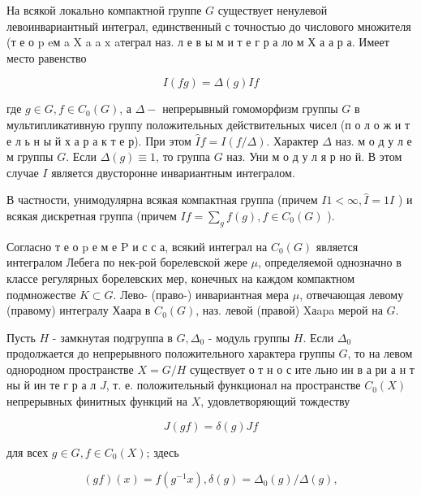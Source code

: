 \documentclass[10pt]{article}
\begin{document}
На всякой локально компактной группе $G$ существует ненулевой левоинвариантный интеграл, единственный с точностью до числового множителя (т е о p eм a X a a $\mathrm{x}$ aтеграл наз. л е в ы м и т е г р а ло м Х а а р а. Имеет место равенство



\[

I(f g)=\Delta(g) I f

\]



где $g \in G, f \in C_{0}(G)$, а $\Delta-$ непрерывный гомоморфизм группы $G$ в мультипликативную группу положительных действительных чисел (п о л о ж и т е л ь н ы й х а р а к т е р). При этом $\hat{I} f=I(f / \Delta)$. Характер $\Delta$ наз. м о д у л е м группы $G$. Если $\Delta(g) \equiv 1$, то группа $G$ наз. Уни м о д у л я р но й. В этом случае $I$ является двусторонне инвариантным интегралом.



В частности, унимодулярна всякая компактная группа (причем $I 1<\infty, \widehat{I}=1 I$ ) и всякая дискретная группа (причем $I f=\sum_{g} f(g), f \in C_{0}(G)$ ).



Согласно т е о $\mathrm{p}$ е м е $\mathrm{P}$ и с с а, всякий интеграл на $C_{0}(G)$ является интегралом Лебега по нек-рой борелевской жере $\mu$, определяемой однозначно в классе регулярных борелевских мер, конечных на каждом компактном подмножестве $K \subset G$. Лево- (право-) инвариантная мера $\mu$, отвечающая левому (правому) интегралу Хаара в $C_{0}(G)$, наз. левой (правой) Xаapa мерой на $G$.



Пусть $H$ - замкнутая подгруппа в $G, \Delta_{0}$ - модуль группы $H$. Если $\Delta_{0}$ продолжается до непрерывного положительного характера группы $G$, то на левом однородном пространстве $X=G / H$ существует о т н о с ите льно ин в а ри а н т ны й ин те г р а л $J$, т. е. положительный функционал на пространстве $C_{0}(X)$ непрерывных финитных функций на $X$, удовлетворяющий тождеству



\[

J(g f)=\delta(g) J f

\]



для всех $g \in G, f \in C_{0}(X)$; здесь



\[

(g f)(x)=f\left(g^{-1} x\right), \delta(g)=\Delta_{0}(g) / \Delta(g),

\]
\end{document}
